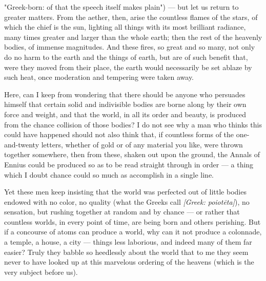  "Greek-born: of that the speech itself makes plain") — but let us return to greater matters. From the aether, then, arise the countless flames of the stars, of which the chief is the sun, lighting all things with its most brilliant radiance, many times greater and larger than the whole earth; then the rest of the heavenly bodies, of immense magnitudes. And these fires, so great and so many, not only do no harm to the earth and the things of earth, but are of such benefit that, were they moved from their place, the earth would necessarily be set ablaze by such heat, once moderation and tempering were taken away.

 Here, can I keep from wondering that there should be anyone who persuades himself that certain solid and indivisible bodies are borne along by their own force and weight, and that the world, in all its order and beauty, is produced from the chance collision of those bodies? I do not see why a man who thinks this could have happened should not also think that, if countless forms of the one-and-twenty letters, whether of gold or of any material you like, were thrown together somewhere, then from these, shaken out upon the ground, the Annals of Ennius could be produced so as to be read straight through in order — a thing which I doubt chance could so much as accomplish in a single line.

 Yet these men keep insisting that the world was perfected out of little bodies endowed with no color, no quality (what the Greeks call \textit{[Greek: poiotēta]}), no sensation, but rushing together at random and by chance — or rather that countless worlds, in every point of time, are being born and others perishing. But if a concourse of atoms can produce a world, why can it not produce a colonnade, a temple, a house, a city — things less laborious, and indeed many of them far easier? Truly they babble so heedlessly about the world that to me they seem never to have looked up at this marvelous ordering of the heavens (which is the very subject before us).

